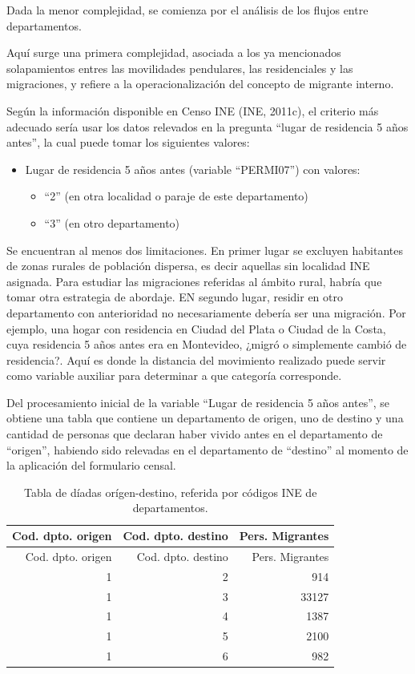 \documentclass[12pt,spanish,]{article}
\providecommand{\tightlist}{%
  \setlength{\itemsep}{0pt}\setlength{\parskip}{0pt}}
\begin{document}
Dada la menor complejidad, se comienza por el análisis de los flujos
entre departamentos.

Aquí surge una primera complejidad, asociada a los ya mencionados
solapamientos entres las movilidades pendulares, las residenciales y las
migraciones, y refiere a la operacionalización del concepto de migrante
interno.

Según la información disponible en Censo INE (INE, 2011c), el criterio
más adecuado sería usar los datos relevados en la pregunta ``lugar de
residencia 5 años antes'', la cual puede tomar los siguientes valores:

\begin{itemize}
\tightlist
\item
  Lugar de residencia 5 años antes (variable ``PERMI07'') con valores:

  \begin{itemize}
  \tightlist
  \item
    ``2'' (en otra localidad o paraje de este departamento)
  \item
    ``3'' (en otro departamento)
  \end{itemize}
\end{itemize}

Se encuentran al menos dos limitaciones. En primer lugar se excluyen
habitantes de zonas rurales de población dispersa, es decir aquellas sin
localidad INE asignada. Para estudiar las migraciones referidas al
ámbito rural, habría que tomar otra estrategia de abordaje. EN segundo
lugar, residir en otro departamento con anterioridad no necesariamente
debería ser una migración. Por ejemplo, una hogar con residencia en
Ciudad del Plata o Ciudad de la Costa, cuya residencia 5 años antes era
en Montevideo, ¿migró o simplemente cambió de residencia?. Aquí es donde
la distancia del movimiento realizado puede servir como variable
auxiliar para determinar a que categoría corresponde.

Del procesamiento inicial de la variable ``Lugar de residencia 5 años
antes'', se obtiene una tabla que contiene un departamento de origen,
uno de destino y una cantidad de personas que declaran haber vivido
antes en el departamento de ``origen'', habiendo sido relevadas en el
departamento de ``destino'' al momento de la aplicación del formulario
censal.

\begin{longtable}[]{@{}rrr@{}}
\caption{Tabla de díadas orígen-destino, referida por códigos INE de
departamentos.}\tabularnewline
\toprule
Cod. dpto. origen & Cod. dpto. destino & Pers. Migrantes\tabularnewline
\midrule
\endfirsthead
\toprule
Cod. dpto. origen & Cod. dpto. destino & Pers. Migrantes\tabularnewline
\midrule
\endhead
1 & 2 & 914\tabularnewline
1 & 3 & 33127\tabularnewline
1 & 4 & 1387\tabularnewline
1 & 5 & 2100\tabularnewline
1 & 6 & 982\tabularnewline
\bottomrule
\end{longtable}
\end{document}
